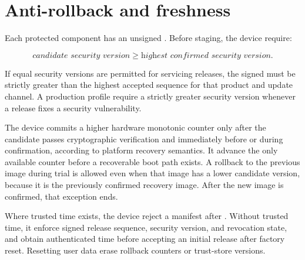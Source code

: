 \section{Anti-rollback and freshness}
\label{sec:rollback}

Each protected component has an unsigned . Before
staging, the device \must require:

\[
  \textit{candidate security version} \geq
  \textit{highest confirmed security version}.
\]

If equal security versions are permitted for servicing releases, the signed
 must be strictly greater than the highest accepted sequence for
that product and update channel. A production profile \should require a strictly
greater security version whenever a release fixes a security vulnerability.

The device commits a higher hardware monotonic counter only after the candidate
passes cryptographic verification and immediately before or during confirmation,
according to platform recovery semantics. It \mustnot advance the only available
counter before a recoverable boot path exists. A rollback to the previous image
during trial is allowed even when that image has a lower candidate version,
because it is the previously confirmed recovery image. After the new image is
confirmed, that exception ends.

Where trusted time exists, the device \must reject a manifest after
. Without trusted time, it \must enforce signed release
sequence, security version, and revocation state, and \should obtain authenticated
time before accepting an initial release after factory reset. Resetting user data
\mustnot erase rollback counters or trust-store versions.

